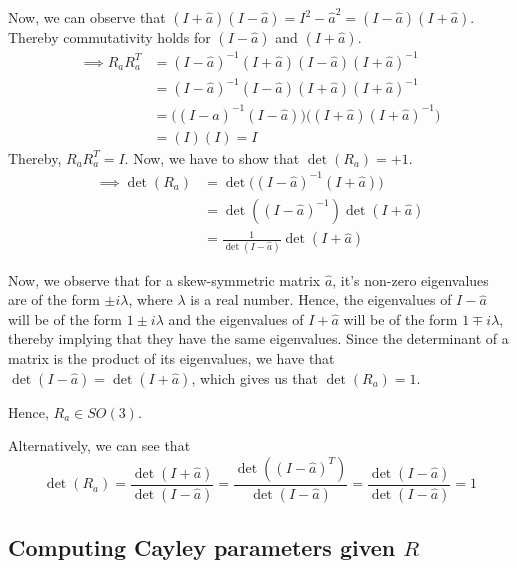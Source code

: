 Now, we can observe that \( (I + \hat{a}) (I - \hat{a}) = I^2 - \hat{a}^2 = (I - \hat{a}) (I + \hat{a}) \).\\
Thereby commutativity holds for \( (I - \hat{a}) \) and \( (I + \hat{a}) \).
\begin{align*}
    \implies
    R_a R_a^T
     & =
    (I - \hat{a})^{-1} (I + \hat{a}) (I - \hat{a}) (I + \hat{a})^{-1}
    \\ & =
    (I - \hat{a})^{-1} (I - \hat{a}) (I + \hat{a}) (I + \hat{a})^{-1}
    \\ & =
    \Big((I - \hat{a})^{-1} (I - \hat{a}) \Big) \Big( (I + \hat{a}) (I + \hat{a})^{-1} \Big)
    \\ & =
    (I)(I)
    = I
\end{align*}
Thereby, \( R_a R_a^T = I \).
Now, we have to show that \( \det(R_a) = +1 \).
\begin{align*}
    \implies
    \det(R_a)
     & = \det \Big( (I - \hat{a})^{-1} (I + \hat{a}) \Big)
    \\ & = \det \left( (I - \hat{a})^{-1} \right) \det (I + \hat{a})
    \\ & = \frac{1}{\det(I - \hat{a})} \det(I + \hat{a})
\end{align*}

Now, we observe that for a skew-symmetric matrix \( \hat{a} \), it's non-zero eigenvalues are of the form \( \pm i \lambda \), where \( \lambda \) is a real number.
Hence, the eigenvalues of \( I - \hat{a} \) will be of the form \( 1 \pm i \lambda \) and the eigenvalues of \( I + \hat{a} \) will be of the form \( 1 \mp i \lambda \), thereby implying that they have the same eigenvalues.
Since the determinant of a matrix is the product of its eigenvalues, we have that \( \det(I - \hat{a}) = \det(I + \hat{a}) \), which gives us that \( \det(R_a) = 1 \).

Hence, \( \boxed{ R_a \in SO(3) } \).

\clearpage
Alternatively, we can see that
\begin{equation*}
    \det(R_a)
    =
    \frac{\det(I + \hat{a})}{\det(I - \hat{a})}
    =
    \frac{\det({(I - \hat{a})}^T)}{\det(I - \hat{a})}
    =
    \frac{{\det(I - \hat{a})}}{\det(I - \hat{a})}
    =
    1
\end{equation*}

\subsection*{Computing Cayley parameters given \( R \) }


